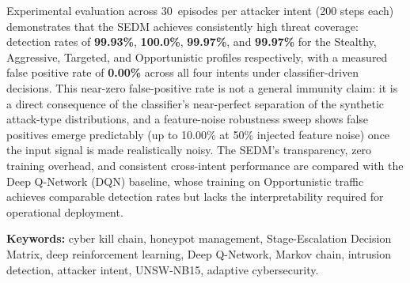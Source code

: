 Experimental evaluation across 30~episodes per attacker intent (200 steps
each) demonstrates that the SEDM achieves consistently high threat coverage:
detection rates of \textbf{99.93\%}, \textbf{100.0\%}, \textbf{99.97\%},
and \textbf{99.97\%} for the Stealthy, Aggressive, Targeted, and
Opportunistic profiles respectively, with a measured false positive rate of
\textbf{0.00\%} across all four intents under classifier-driven decisions.
This near-zero false-positive rate is not a general immunity claim: it is a
direct consequence of the classifier's near-perfect separation of the
synthetic attack-type distributions, and a feature-noise robustness sweep
shows false positives emerge predictably (up to 10.00\% at 50\% injected
feature noise) once the input signal is made realistically noisy.
The SEDM's transparency, zero training overhead, and consistent cross-intent
performance are compared with the Deep Q-Network (DQN) baseline, whose
training on Opportunistic traffic achieves comparable detection rates
but lacks the interpretability required for operational deployment.

\vspace{1em}
\noindent\textbf{Keywords:} cyber kill chain, honeypot management, Stage-Escalation
Decision Matrix, deep reinforcement learning, Deep Q-Network, Markov chain,
intrusion detection, attacker intent, UNSW-NB15, adaptive cybersecurity.
\clearpage
